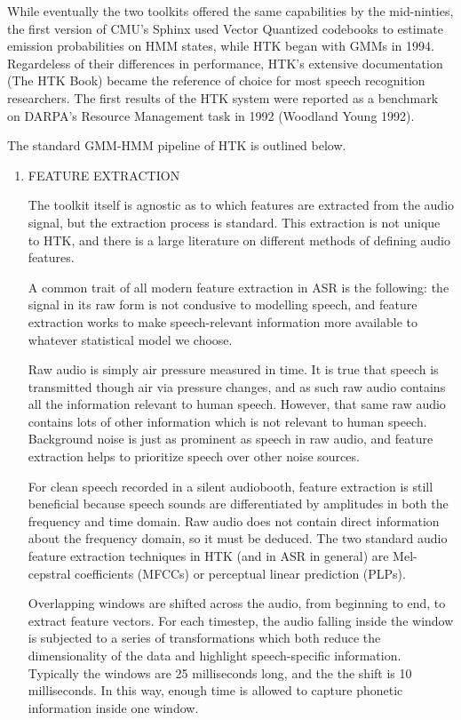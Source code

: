 \documentclass[10pt,a4paper]{article}
\begin{document}
While eventually the two toolkits offered the same capabilities by the mid-ninties, the first version of CMU's Sphinx used Vector Quantized codebooks to estimate emission probabilities on HMM states, while HTK began with GMMs in 1994. Regardeless of their differences in performance, HTK's extensive documentation (The HTK Book) became the reference of choice for most speech recognition researchers. The first results of the HTK system were reported as a benchmark on DARPA's Resource Management task in 1992 (Woodland Young 1992).

The standard GMM-HMM pipeline of HTK is outlined below. 

\begin{enumerate}

\item FEATURE EXTRACTION
  
  The toolkit itself is agnostic as to which features are extracted from the audio signal, but the extraction process is standard. This extraction is not unique to HTK, and there is a large literature on different methods of defining audio features.
  
  A common trait of all modern feature extraction in ASR is the following: the signal in its raw form is not condusive to modelling speech, and feature extraction works to make speech-relevant information more available to whatever statistical model we choose.

  Raw audio is simply air pressure measured in time. It is true that speech is transmitted though air via pressure changes, and as such raw audio contains all the information relevant to human speech. However, that same raw audio contains lots of other information which is not relevant to human speech. Background noise is just as prominent as speech in raw audio, and feature extraction helps to prioritize speech over other noise sources.

  For clean speech recorded in a silent audiobooth, feature extraction is still beneficial because speech sounds are differentiated by amplitudes in both the frequency and time domain. Raw audio does not contain direct information about the frequency domain, so it must be deduced.
  The two standard audio feature extraction techniques in HTK (and in ASR in general) are Mel-cepstral coefficients (MFCCs) or perceptual linear prediction (PLPs).

  Overlapping windows are shifted across the audio, from beginning to end, to extract feature vectors. For each timestep, the audio falling inside the window is subjected to a series of transformations which both reduce the dimensionality of the data and highlight speech-specific information. Typically the windows are 25 milliseconds long, and the the shift is 10 milliseconds. In this way, enough time is allowed to capture phonetic information inside one window.


\end{enumerate}
\end{document}
